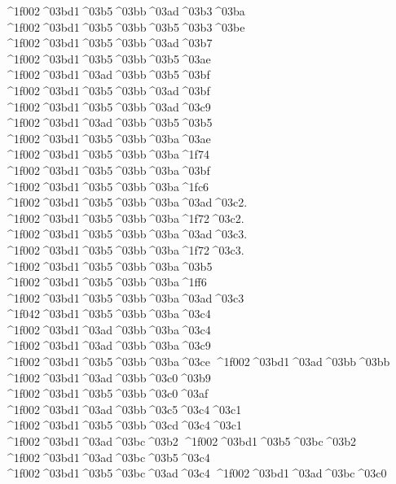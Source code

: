 {^^^^1f002^^^^03bd1^^^^03b5^^^^03bb^^^^03ad^^^^03b3^^^^03ba
^^^^1f002^^^^03bd1^^^^03b5^^^^03bb^^^^03b5^^^^03b3^^^^03be		%
^^^^1f002^^^^03bd1^^^^03b5^^^^03bb^^^^03ad^^^^03b7   		%
^^^^1f002^^^^03bd1^^^^03b5^^^^03bb^^^^03b5^^^^03ae
^^^^1f002^^^^03bd1^^^^03ad^^^^03bb^^^^03b5^^^^03bf		%
^^^^1f002^^^^03bd1^^^^03b5^^^^03bb^^^^03ad^^^^03bf
^^^^1f002^^^^03bd1^^^^03b5^^^^03bb^^^^03ad^^^^03c9
^^^^1f002^^^^03bd1^^^^03ad^^^^03bb^^^^03b5^^^^03b5
^^^^1f002^^^^03bd1^^^^03b5^^^^03bb^^^^03ba^^^^03ae 		%
^^^^1f002^^^^03bd1^^^^03b5^^^^03bb^^^^03ba^^^^1f74
^^^^1f002^^^^03bd1^^^^03b5^^^^03bb^^^^03ba^^^^03bf
^^^^1f002^^^^03bd1^^^^03b5^^^^03bb^^^^03ba^^^^1fc6
^^^^1f002^^^^03bd1^^^^03b5^^^^03bb^^^^03ba^^^^03ad^^^^03c2.
^^^^1f002^^^^03bd1^^^^03b5^^^^03bb^^^^03ba^^^^1f72^^^^03c2.
^^^^1f002^^^^03bd1^^^^03b5^^^^03bb^^^^03ba^^^^03ad^^^^03c3.
^^^^1f002^^^^03bd1^^^^03b5^^^^03bb^^^^03ba^^^^1f72^^^^03c3.
^^^^1f002^^^^03bd1^^^^03b5^^^^03bb^^^^03ba^^^^03b5
^^^^1f002^^^^03bd1^^^^03b5^^^^03bb^^^^03ba^^^^1ff6
^^^^1f002^^^^03bd1^^^^03b5^^^^03bb^^^^03ba^^^^03ad^^^^03c3
^^^^1f042^^^^03bd1^^^^03b5^^^^03bb^^^^03ba^^^^03c4   		%
^^^^1f002^^^^03bd1^^^^03ad^^^^03bb^^^^03ba^^^^03c4
^^^^1f002^^^^03bd1^^^^03ad^^^^03bb^^^^03ba^^^^03c9		%
^^^^1f002^^^^03bd1^^^^03b5^^^^03bb^^^^03ba^^^^03ce
^^^^1f002^^^^03bd1^^^^03ad^^^^03bb^^^^03bb    		%
^^^^1f002^^^^03bd1^^^^03ad^^^^03bb^^^^03c0^^^^03b9		%
^^^^1f002^^^^03bd1^^^^03b5^^^^03bb^^^^03c0^^^^03af
^^^^1f002^^^^03bd1^^^^03ad^^^^03bb^^^^03c5^^^^03c4^^^^03c1 %
^^^^1f002^^^^03bd1^^^^03b5^^^^03bb^^^^03cd^^^^03c4^^^^03c1
^^^^1f002^^^^03bd1^^^^03ad^^^^03bc^^^^03b2  		%
^^^^1f002^^^^03bd1^^^^03b5^^^^03bc^^^^03b2
^^^^1f002^^^^03bd1^^^^03ad^^^^03bc^^^^03b5^^^^03c4 		%
^^^^1f002^^^^03bd1^^^^03b5^^^^03bc^^^^03ad^^^^03c4
^^^^1f002^^^^03bd1^^^^03ad^^^^03bc^^^^03c0  		%
}
